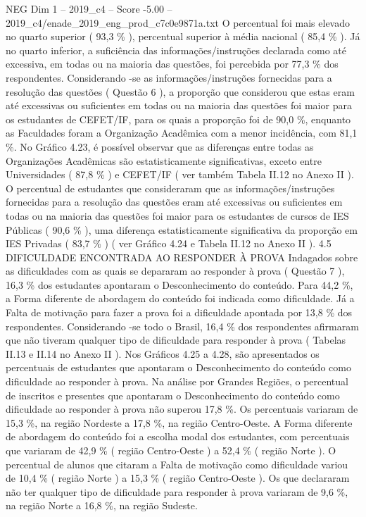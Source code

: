 \begin{textsample}{NEG Dim 1 – 2019\_c4 – Score -5.00 – 2019\_c4/enade\_2019\_eng\_prod\_c7c0e9871a.txt}
O percentual foi mais elevado no quarto superior ( 93,3 \% ), percentual superior à média nacional ( 85,4 \% ).
Já no quarto inferior, a suficiência das informações/instruções declarada como até excessiva, em todas ou na maioria das questões, foi percebida por 77,3 \% dos respondentes.
Considerando -se as informações/instruções fornecidas para a resolução das questões ( Questão 6 ), a proporção que considerou que estas eram até excessivas ou suficientes em todas ou na maioria das questões foi maior para os estudantes de CEFET/IF, para os quais a proporção foi de 90,0 \%, enquanto as Faculdades foram a Organização Acadêmica com a menor incidência, com 81,1 \%.
No Gráfico 4.23, é possível observar que as diferenças entre todas as Organizações Acadêmicas são estatisticamente significativas, exceto entre Universidades ( 87,8 \% ) e CEFET/IF ( ver também Tabela II.12 no Anexo II ).
O percentual de estudantes que consideraram que as informações/instruções fornecidas para a resolução das questões eram até excessivas ou suficientes em todas ou na maioria das questões foi maior para os estudantes de cursos de IES Públicas ( 90,6 \% ), uma diferença estatisticamente significativa da proporção em IES Privadas ( 83,7 \% ) ( ver Gráfico 4.24 e Tabela II.12 no Anexo II ). 4.5 DIFICULDADE ENCONTRADA AO RESPONDER À PROVA Indagados sobre as dificuldades com as quais se depararam ao responder à prova ( Questão 7 ), 16,3 \% dos estudantes apontaram o Desconhecimento do conteúdo.
Para 44,2 \%, a Forma diferente de abordagem do conteúdo foi indicada como dificuldade.
Já a Falta de motivação para fazer a prova foi a dificuldade apontada por 13,8 \% dos respondentes.
Considerando -se todo o Brasil, 16,4 \% dos respondentes afirmaram que não tiveram qualquer tipo de dificuldade para responder à prova ( Tabelas II.13 e II.14 no Anexo II ).
Nos Gráficos 4.25 a 4.28, são apresentados os percentuais de estudantes que apontaram o Desconhecimento do conteúdo como dificuldade ao responder à prova.
Na análise por Grandes Regiões, o percentual de inscritos e presentes que apontaram o Desconhecimento do conteúdo como dificuldade ao responder à prova não superou 17,8 \%.
Os percentuais variaram de 15,3 \%, na região Nordeste a 17,8 \%, na região Centro-Oeste.
A Forma diferente de abordagem do conteúdo foi a escolha modal dos estudantes, com percentuais que variaram de 42,9 \% ( região Centro-Oeste ) a 52,4 \% ( região Norte ).
O percentual de alunos que citaram a Falta de motivação como dificuldade variou de 10,4 \% ( região Norte ) a 15,3 \% ( região Centro-Oeste ).
Os que declararam não ter qualquer tipo de dificuldade para responder à prova variaram de 9,6 \%, na região Norte a 16,8 \%, na região Sudeste.

\end{textsample}
